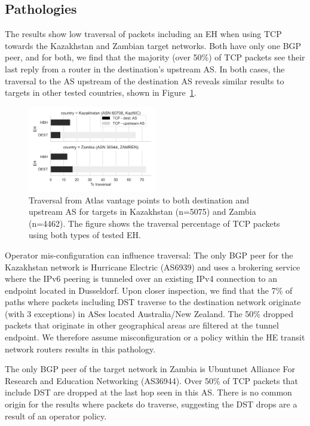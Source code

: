 \documentclass[conference]{IEEEtran}
\begin{document}
\subsection{Pathologies}
    \label{subsec: pathologies}

The results show low traversal of packets including an EH when using TCP towards the Kazakhstan and Zambian target networks. Both have only one BGP peer, and for both, we find that the majority (over 50\%) of TCP packets see their last reply from a router in the destination's upstream AS. In both cases, the traversal to the AS upstream of the destination AS reveals similar results to targets in other tested countries, shown in Figure~\ref{fig:traversal_pathologies}.

\begin{figure}
\centering
  \includegraphics[width=0.5\textwidth]{traversal-pathologies.png}
  \caption{Traversal from Atlas vantage points to both destination and upstream AS for targets in Kazakhstan (n=5075) and Zambia (n=4462). The figure shows the traversal percentage of TCP packets using both types of tested EH.}
  \label{fig:traversal_pathologies}
\end{figure}

Operator mis-configuration can influence traversal: The only BGP peer for the Kazakhstan network is Hurricane Electric (AS6939) and uses a  brokering service where the IPv6 peering is tunneled over an existing IPv4 connection to an endpoint located in Dusseldorf. Upon closer inspection, we find that the 7\% of paths where packets including DST traverse to the destination network originate (with 3 exceptions) in ASes located Australia/New Zealand. The 50\% dropped packets that originate in other geographical areas are filtered at the tunnel endpoint. We therefore assume misconfiguration or a policy within the HE transit network routers results in this pathology. 


The only BGP peer of the target network in Zambia is Ubuntunet Alliance For Research and Education Networking (AS36944). Over 50\% of TCP packets that include DST are dropped at the last hop seen in this AS. There is no common origin for the results where packets do traverse, suggesting the DST drops are a result of an operator policy. 
\end{document}
